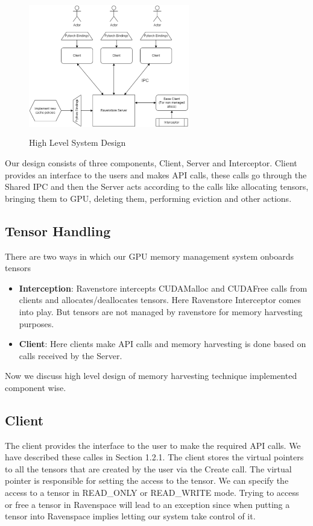 \documentclass{article}
\begin{document}
\begin{figure}[!htbp]
	\centering
	\includegraphics[height=6cm, width=7cm]{figures/hld.png}
	\caption{High Level System Design}
\end{figure}

Our design consists of three components, Client, Server and Interceptor. Client provides an interface to the users and makes API calls, 
these calls go through the Shared IPC and then the Server acts according to the calls like allocating tensors,
bringing them to GPU, deleting them, performing eviction and other actions. 

\subsection{Tensor Handling}
There are two ways in which our GPU memory management system onboards tensors
\begin{itemize}
	\item \textbf{Interception}: Ravenstore intercepts CUDAMalloc and CUDAFree calls from clients
	and allocates/deallocates tensors. Here Ravenstore Interceptor comes into play. But tensors are not managed by ravenstore for memory harvesting purposes.
	\item \textbf{Client}: Here clients make API calls and memory harvesting is done based on calls received by the Server.
\end{itemize}

Now we discuss high level design of memory harvesting technique implemented component wise.

\subsection{Client}
The client provides the interface to the user to make the required API calls. We have described these calles in Section 1.2.1.
The client stores the virtual pointers to all the tensors that are created by the user via the Create call. The virtual pointer is
responsible for setting the access to the tensor. We can specify the access to a tensor in READ\_ONLY or READ\_WRITE mode. 
Trying to access or free a tensor in Ravenspace will lead to an exception since when putting a tensor into Ravenspace implies letting our
system take control of it.
\end{document}
